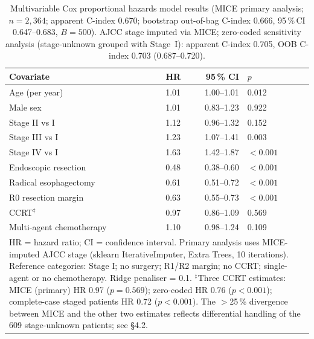 \documentclass[12pt,a4paper]{article}
\begin{document}
\begin{table}[H]
  \centering
  \caption{Multivariable Cox proportional hazards model results
    (MICE primary analysis; $n = 2{,}364$; apparent C-index 0.670;
    bootstrap out-of-bag C-index 0.666, 95\,\%\,CI 0.647--0.683,
    $B = 500$). AJCC stage imputed via MICE; zero-coded sensitivity
    analysis (stage-unknown grouped with Stage~I): apparent C-index
    0.705, OOB C-index 0.703 (0.687--0.720).}
  \label{tab:cox}
  \begin{tabular}{lrrl}
    \toprule
    Covariate & HR & 95\,\% CI & $p$ \\
    \midrule
    Age (per year)              & 1.01 & 1.00--1.01  & 0.012 \\
    Male sex                    & 1.01 & 0.83--1.23  & 0.922 \\
    Stage II vs I               & 1.12 & 0.96--1.32  & 0.152 \\
    Stage III vs I              & 1.23 & 1.07--1.41  & 0.003 \\
    Stage IV vs I               & 1.63 & 1.42--1.87  & $< 0.001$ \\
    Endoscopic resection        & 0.48 & 0.38--0.60  & $< 0.001$ \\
    Radical esophagectomy       & 0.61 & 0.51--0.72  & $< 0.001$ \\
    R0 resection margin         & 0.63 & 0.55--0.73  & $< 0.001$ \\
    CCRT$^\ddagger$             & 0.97 & 0.86--1.09  & 0.569 \\
    Multi-agent chemotherapy    & 1.10 & 0.98--1.24  & 0.109 \\
    \bottomrule
    \multicolumn{4}{p{0.75\textwidth}}{\small HR = hazard ratio; CI =
      confidence interval. Primary analysis uses MICE-imputed AJCC stage
      (sklearn IterativeImputer, Extra Trees, 10 iterations).
      Reference categories: Stage I; no surgery; R1/R2 margin; no CCRT;
      single-agent or no chemotherapy. Ridge penaliser = 0.1.
      $^\ddagger$Three CCRT estimates: MICE (primary) HR 0.97
      ($p = 0.569$); zero-coded HR 0.76 ($p < 0.001$); complete-case
      staged patients HR 0.72 ($p < 0.001$). The $>$25\,\% divergence
      between MICE and the other two estimates reflects differential
      handling of the 609 stage-unknown patients; see §4.2.}
  \end{tabular}
\end{table}

\clearpage
\end{document}
